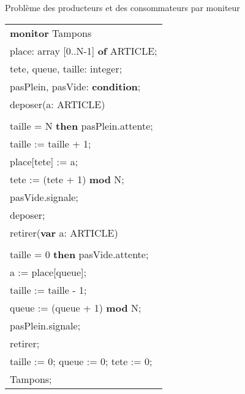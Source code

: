 \begin{algorithm}[!ht]
\caption{Problème des producteurs et des consommateurs par moniteur}\label{moniteur:ProdCons}
\begin{center}
\begin{tabular}{l}
{\bf monitor} Tampons \\
\hspace{0.3cm}{\bf var} place: array [0..N-1] {\bf of} ARTICLE; \\
\hspace{0.3cm}{\bf var} tete, queue, taille: integer; \\
\hspace{0.3cm}{\bf var} pasPlein, pasVide: {\bf condition}; \\

\hspace{0.3cm}{\bf entry procedure} deposer(a: ARTICLE) \\
\hspace{0.6cm}{\bf begin} \\
\hspace{1cm}{\bf if} taille = N {\bf then} pasPlein.attente; \\
\hspace{1cm}taille := taille + 1; \\
\hspace{1cm}place[tete] := a; \\
\hspace{1cm}tete := (tete + 1) {\bf mod} N; \\
\hspace{1cm}pasVide.signale; \\
\hspace{0.6cm}{\bf end} deposer; \\

\hspace{0.3cm}{\bf entry procedure} retirer({\bf var} a: ARTICLE) \\
\hspace{0.6cm}{\bf begin} \\
\hspace{1cm}{\bf if} taille = 0 {\bf then} pasVide.attente; \\
\hspace{1cm}a := place[queue]; \\
\hspace{1cm}taille := taille - 1; \\
\hspace{1cm}queue := (queue + 1) {\bf mod} N; \\
\hspace{1cm}pasPlein.signale; \\
\hspace{0.6cm}{\bf end} retirer; \\

\hspace{0.3cm}{\bf begin} taille := 0; queue := 0; tete := 0; \\
\hspace{0.3cm}{\bf end} Tampons;
\end{tabular}
\end{center}
\end{algorithm}
